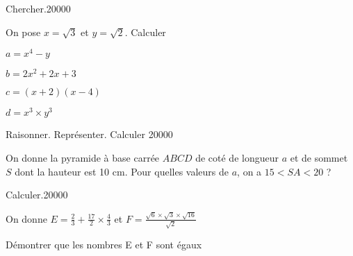 
\begin{pageParcourst} %
 
 
 \begin{ExoCtN}{Chercher.}{2}{0}{0}{0}{0}

On pose $x = \sqrt{3}$ et $y=\sqrt{2}$. Calculer

\begin{enumerate}
\begin{minipage}{0.5\linewidth}
\item $a= x^4-y$
\item $b=2x^2+2x+3$
\end{minipage}
\begin{minipage}{0.5\linewidth}
\item $c=(x+2)(x-4)$
\item $d=x^3 \times y^3$
\end{minipage}
\end{enumerate}
\end{ExoCtN}


 
\begin{ExoCtN}{Raisonner. Représenter. Calculer }{2}{0}{0}{0}{0}
 
On donne la pyramide à base carrée $ABCD$ de coté de longueur $a$ et de sommet $S$ dont la hauteur est 10 cm.
Pour quelles valeurs de $a$, on a $15 < SA < 20$ ?
\end{ExoCtN}



\begin{ExoCtN}{Calculer.}{2}{0}{0}{0}{0}
 
On donne $E = \frac{2}{3}+\frac{17}{2} \times \frac{4}{3}$ et $F = \frac{\sqrt 6 \times \sqrt 3\times \sqrt{16} }{\sqrt 2}  $ 
 
Démontrer que les nombres E et F sont égaux
\end{ExoCtN}

 

%



\end{pageParcourst}
